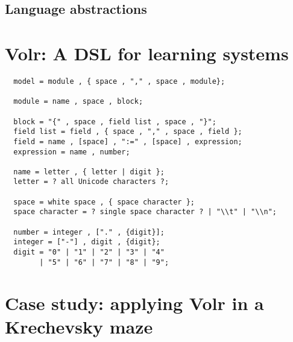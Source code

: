 \documentclass[a4paper,oneside]{memoir}
\begin{document}
\subsection{Language abstractions}

\section{Volr: A DSL for learning systems}
\label{volr}

\begin{verbatim}
  model = module , { space , "," , space , module};

  module = name , space , block;

  block = "{" , space , field list , space , "}";
  field list = field , { space , "," , space , field };
  field = name , [space] , ":=" , [space] , expression;
  expression = name , number;

  name = letter , { letter | digit };
  letter = ? all Unicode characters ?;

  space = white space , { space character };
  space character = ? single space character ? | "\\t" | "\\n";

  number = integer , ["." , {digit}];
  integer = ["-"] , digit , {digit};
  digit = "0" | "1" | "2" | "3" | "4"
        | "5" | "6" | "7" | "8" | "9";
\end{verbatim}

\section{Case study: applying Volr in a Krechevsky maze}
\label{case}

\clearpage

\printglossary

\printbibliography
\end{document}
